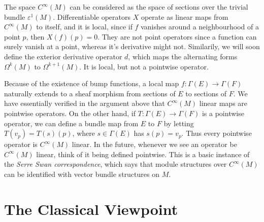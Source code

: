 \begin{example}
    The space $C^\infty(M)$ can be considered as the space of sections over the trivial bundle $\varepsilon^1(M)$. Differentiable operators $X$ operate as linear maps from $C^\infty(M)$ to itself, and it is local, since if $f$ vanishes around a neighbourhood of a point $p$, then $X(f)(p) = 0$. They are not point operators since a function can surely vanish at a point, whereas it's derivative might not. Similarily, we will soon define the exterior derivative operator $d$, which maps the alternating forms $\Omega^k(M)$ to $\Omega^{k+1}(M)$. It is local, but not a pointwise operator.
\end{example}

Because of the existence of bump functions, a local map $f: \Gamma(E) \to \Gamma(F)$ naturally extends to a sheaf morphism from sections of $E$ to sections of $F$. We have essentially verified in the argument above that $C^\infty(M)$ linear maps are pointwise operators. On the other hand,  if $T: \Gamma(E) \to \Gamma(F)$ is a pointwise operator, we can define a bundle map from $E$ to $F$ by letting $T(v_p) = T(s)(p)$, where $s \in \Gamma(E)$ has $s(p) = v_p$. Thus every pointwise operator is $C^\infty(M)$ linear. In the future, whenever we see an operator be $C^\infty(M)$ linear, think of it being defined pointwise. This is a basic instance of the {\it Serre Swan correspondence}, which says that module structures over $C^\infty(M)$ can be identified with vector bundle structures on $M$.

\section{The Classical Viewpoint}

